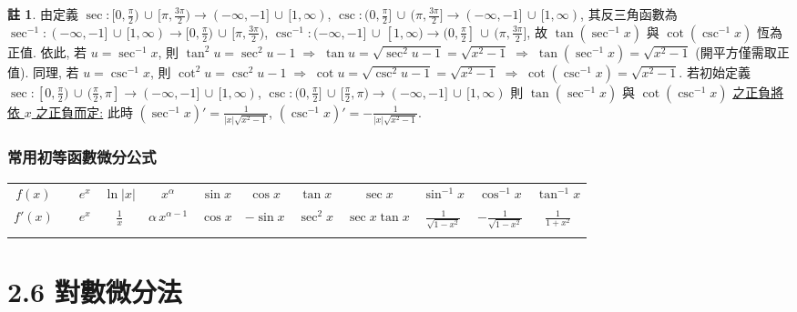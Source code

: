 \documentclass[12pt]{extarticle}
\newcommand{\ds}{\displaystyle}
\newcommand{\ie}{\;\Longrightarrow\;}
\theoremstyle{definition}
\newtheorem*{rmk}{註}
\begin{document}
{\begin{rmk}
  由定義 $\sec:[0, \frac{\pi}{2})\,\cup\,[\pi, \frac{3\pi}{2})\to(-\infty, -1]\,\cup\,[1,\infty)$, $\csc:(0, \frac{\pi}{2}]\,\cup\,(\pi, \frac{3\pi}{2}]\to(-\infty, -1]\,\cup\,[1,\infty)$, 其反三角函數為 $\sec^{-1}:(-\infty, -1]\,\cup\,[1,\infty)\to[0, \frac{\pi}{2})\,\cup\,[\pi, \frac{3\pi}{2})$, $\csc^{-1}:(-\infty, -1]\,\cup\,[1,\infty)\to(0, \frac{\pi}{2}]\,\cup\,(\pi, \frac{3\pi}{2}]$, 故 $\tan(\sec^{-1} x)$ 與 $\cot(\csc^{-1} x)$ 恆為正值. 依此, 若 $u = \sec^{-1}x$, 則 $\tan^2 u = \sec^2 u - 1\ie\tan u = \sqrt{\sec^2 u - 1} = \sqrt{x^2 - 1} \ie\tan(\sec^{-1} x) = \sqrt{x^2 - 1}$ (開平方僅需取正值). 同理, 若 $u = \csc^{-1}x$, 則 $\cot^2 u = \csc^2 u - 1\ie\cot u = \sqrt{\csc^2 u - 1} = \sqrt{x^2 - 1}\ie \cot(\csc^{-1} x) = \sqrt{x^2 - 1}$. 若初始定義 $\sec:[0, \frac{\pi}{2})\,\cup\,(\frac{\pi}{2}, \pi]\to(-\infty, -1]\,\cup\,[1,\infty)$, $\csc:\big(0, \frac{\pi}{2}\big]\,\cup\,[\frac{\pi}{2}, \pi)\to(-\infty, -1]\,\cup\,[1,\infty)$ 則 $\tan(\sec^{-1} x)$ 與 $\cot(\csc^{-1} x)$ \href{https://math.stackexchange.com/questions/3735966/why-the-derivative-of-inverse-secant-has-an-absolute-value}{之正負將依 $x$ 之正負而定:} 此時 $\ds(\sec^{-1} x)' = \frac{1}{|x|\sqrt{x^2 - 1}}$, $\ds(\csc^{-1} x)' = -\frac{1}{|x|\sqrt{x^2 - 1}}$.
\end{rmk}
}{}

\subsubsection*{常用初等函數微分公式}

\begin{table}[!htbp]
  \centering
  \begin{tabular}{c|ccccccccccc}
    \toprule
    \addlinespace[2mm]
    $\ds f(x)$ & & $\ds e^x$ & $\ds\ln |x|$ & $\ds x^\alpha$ & $\ds\sin x$ & $\ds\cos x$ & $\ds\tan x$ & $\ds\sec x$ & $\ds\sin^{-1}\!x$ & $\ds\cos^{-1}\!x$ & $\ds\tan^{-1}\!x$ \\
    \addlinespace[2mm]
    \midrule
    \addlinespace[2mm]
    $\ds f'(x)$ & & $\ds e^x$ & $\ds\frac{1}{x}$ & $\ds \alpha\,x^{\alpha - 1}$ & $\ds\cos x$ & $\ds-\sin x$ & $\ds\sec^2\!x$ & $\ds\sec x\tan x$ & $\ds\frac{1}{\sqrt{1 - x^2}}$ & $\ds -\frac{1}{\sqrt{1 - x^2}}$ & $\ds\frac{1}{1 + x^2}$ \\
    \addlinespace[2mm]
    \bottomrule
  \end{tabular}
\end{table}

\section*{2.6 對數微分法}
\end{document}
